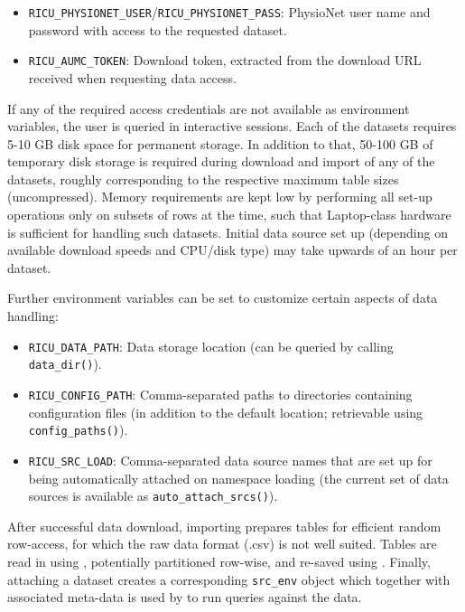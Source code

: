 \documentclass[
]{jss}
\providecommand{\tightlist}{%
  \setlength{\itemsep}{0pt}\setlength{\parskip}{0pt}}
\begin{document}
\begin{itemize}
\tightlist
\item
  \texttt{RICU\_PHYSIONET\_USER}/\texttt{RICU\_PHYSIONET\_PASS}:
  PhysioNet user name and password with access to the requested dataset.
\item
  \texttt{RICU\_AUMC\_TOKEN}: Download token, extracted from the
  download URL received when requesting data access.
\end{itemize}

If any of the required access credentials are not available as
environment variables, the user is queried in interactive sessions. Each
of the datasets requires 5-10 GB disk space for permanent storage. In
addition to that, 50-100 GB of temporary disk storage is required during
download and import of any of the datasets, roughly corresponding to the
respective maximum table sizes (uncompressed). Memory requirements are
kept low by performing all set-up operations only on subsets of rows at
the time, such that Laptop-class hardware is sufficient for handling
such datasets. Initial data source set up (depending on available
download speeds and CPU/disk type) may take upwards of an hour per
dataset.

Further environment variables can be set to customize certain aspects of
 data handling:

\begin{itemize}
\tightlist
\item
  \texttt{RICU\_DATA\_PATH}: Data storage location (can be queried by
  calling \texttt{data\_dir()}).
\item
  \texttt{RICU\_CONFIG\_PATH}: Comma-separated paths to directories
  containing configuration files (in addition to the default location;
  retrievable using \texttt{config\_paths()}).
\item
  \texttt{RICU\_SRC\_LOAD}: Comma-separated data source names that are
  set up for being automatically attached on namespace loading (the
  current set of data sources is available as
  \texttt{auto\_attach\_srcs()}).
\end{itemize}

After successful data download, importing prepares tables for efficient
random row-access, for which the raw data format (.csv) is not well
suited. Tables are read in using  \citep{hester2020},
potentially partitioned row-wise, and re-saved using . Finally,
attaching a dataset creates a corresponding \texttt{src\_env} object
which together with associated meta-data is used by  to run
queries against the data.
\end{document}
